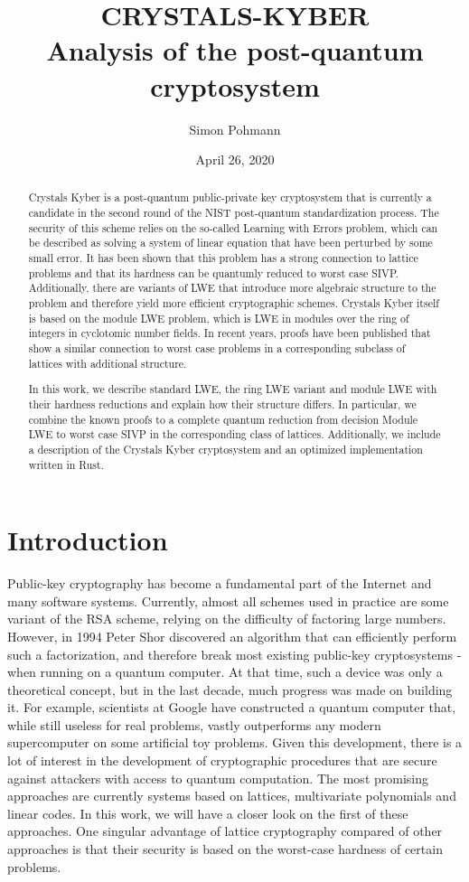 \documentclass{report}
\title{CRYSTALS-KYBER\\Analysis of the post-quantum cryptosystem}
\author{Simon Pohmann}
\begin{document}
\date{April 26, 2020}
\maketitle

\begin{abstract}
Crystals Kyber is a post-quantum public-private key cryptosystem that is currently a candidate in the second round of the NIST post-quantum standardization process. The security of this scheme relies on the so-called Learning with Errors problem, which can be described as solving a system of linear equation that have been perturbed by some small error. It has been shown that this problem has a strong connection to lattice problems and that its hardness can be quantumly reduced to worst case SIVP. Additionally, there are variants of LWE that introduce more algebraic structure to the problem and therefore yield more efficient cryptographic schemes. Crystals Kyber itself is based on the module LWE problem, which is LWE in modules over the ring of integers in cyclotomic number fields. In recent years, proofs have been published that show a similar connection to worst case problems in a corresponding subclass of lattices with additional structure. 

In this work, we describe standard LWE, the ring LWE variant and module LWE with their hardness reductions and explain how their structure differs. In particular, we combine the known proofs to a complete quantum reduction from decision Module LWE to worst case SIVP in the corresponding class of lattices. Additionally, we include a description of the Crystals Kyber cryptosystem and an optimized implementation written in Rust.
\end{abstract}

\tableofcontents

\chapter{Introduction}
Public-key cryptography has become a fundamental part of the Internet and many software systems. Currently, almost all schemes used in practice are some variant of the RSA scheme, relying on the difficulty of factoring large numbers. However, in 1994 Peter Shor discovered an algorithm that can efficiently perform such a factorization, and therefore break most existing public-key cryptosystems - when running on a quantum computer. At that time, such a device was only a theoretical concept, but in the last decade, much progress was made on building it. For example, scientists at Google \cite{GoogleQuantumComputer} have constructed a quantum computer that, while still useless for real problems, vastly outperforms any modern supercomputer on some artificial toy problems. Given this development, there is a lot of interest in the development of cryptographic procedures that are secure against attackers with access to quantum computation. The most promising approaches are currently systems based on lattices, multivariate polynomials and linear codes. In this work, we will have a closer look on the first of these approaches. One singular advantage of lattice cryptography compared of other approaches is that their security is based on the worst-case hardness of certain problems.
\end{document}
